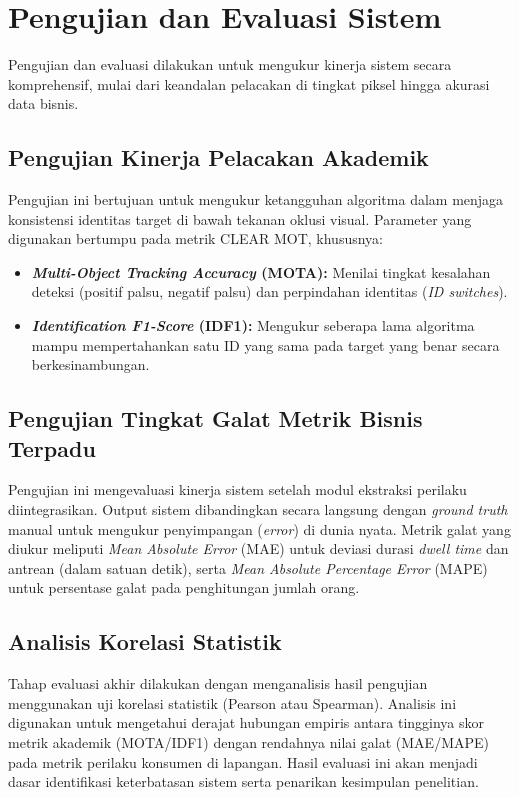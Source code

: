 \section{Pengujian dan Evaluasi Sistem}

Pengujian dan evaluasi dilakukan untuk mengukur kinerja sistem secara komprehensif, mulai dari keandalan pelacakan di tingkat piksel hingga akurasi data bisnis.

\subsection{Pengujian Kinerja Pelacakan Akademik}
Pengujian ini bertujuan untuk mengukur ketangguhan algoritma dalam menjaga konsistensi identitas target di bawah tekanan oklusi visual. Parameter yang digunakan bertumpu pada metrik CLEAR MOT, khususnya:
\begin{itemize}
    \item \textbf{\textit{Multi-Object Tracking Accuracy} (MOTA):} Menilai tingkat kesalahan deteksi (positif palsu, negatif palsu) dan perpindahan identitas (\textit{ID switches}).
    \item \textbf{\textit{Identification F1-Score} (IDF1):} Mengukur seberapa lama algoritma mampu mempertahankan satu ID yang sama pada target yang benar secara berkesinambungan.
    \end{itemize}

\subsection{Pengujian Tingkat Galat Metrik Bisnis Terpadu}
Pengujian ini mengevaluasi kinerja sistem setelah modul ekstraksi perilaku diintegrasikan. Output sistem dibandingkan secara langsung dengan \textit{ground truth} manual untuk mengukur penyimpangan (\textit{error}) di dunia nyata. Metrik galat yang diukur meliputi \textit{Mean Absolute Error} (MAE) untuk deviasi durasi \textit{dwell time} dan antrean (dalam satuan detik), serta \textit{Mean Absolute Percentage Error} (MAPE) untuk persentase galat pada penghitungan jumlah orang.

\subsection{Analisis Korelasi Statistik}
Tahap evaluasi akhir dilakukan dengan menganalisis hasil pengujian menggunakan uji korelasi statistik (Pearson atau Spearman). Analisis ini digunakan untuk mengetahui derajat hubungan empiris antara tingginya skor metrik akademik (MOTA/IDF1) dengan rendahnya nilai galat (MAE/MAPE) pada metrik perilaku konsumen di lapangan. Hasil evaluasi ini akan menjadi dasar identifikasi keterbatasan sistem serta penarikan kesimpulan penelitian.